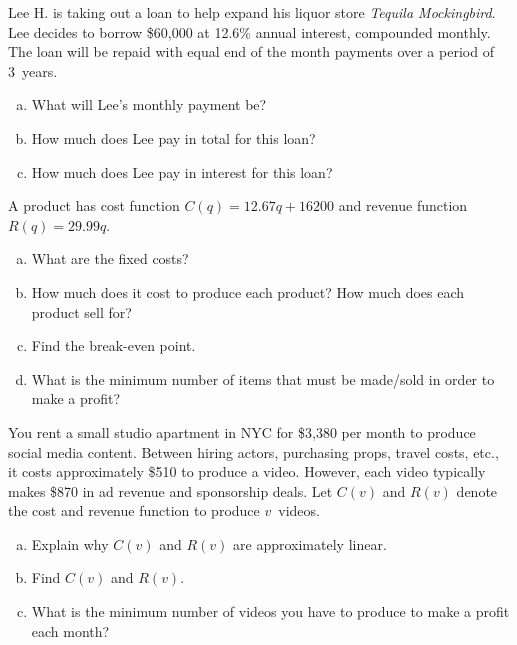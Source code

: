 \documentclass[11pt,letterpaper]{article}
\begin{document}

 Lee H. is taking out a loan to help expand his liquor store \textit{Tequila Mockingbird}. Lee decides to borrow \$60,000 at 12.6\% annual interest, compounded monthly. The loan will be repaid with equal end of the month payments over a period of 3~years. 
	\begin{enumerate}[(a)]
	\item What will Lee's monthly payment be?
	\item How much does Lee pay in total for this loan?
	\item How much does Lee pay in interest for this loan?
	\end{enumerate}



\newpage



 A product has cost function $C(q)= 12.67q + 16200$ and revenue function $R(q)= 29.99q$. 
	\begin{enumerate}[(a)]
	\item What are the fixed costs? 
	\item How much does it cost to produce each product? How much does each product sell for?
	\item Find the break-even point.
	\item What is the minimum number of items that must be made/sold in order to make a profit?
	\end{enumerate}



\newpage




 You rent a small studio apartment in NYC for \$3,380 per month to produce social media content. Between hiring actors, purchasing props, travel costs, etc., it costs approximately \$510 to produce a video. However, each video typically makes \$870 in ad revenue and sponsorship deals. Let $C(v)$ and $R(v)$ denote the cost and revenue function to produce $v$~videos. 
	\begin{enumerate}[(a)]
	\item Explain why $C(v)$ and $R(v)$ are approximately linear. 
	\item Find $C(v)$ and $R(v)$. 
	\item What is the minimum number of videos you have to produce to make a profit each month? 
	\end{enumerate}
\end{document}
